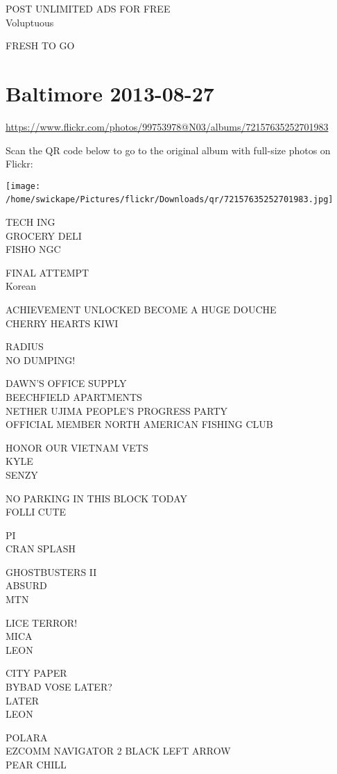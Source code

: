 \documentclass[10pt,letterpaper]{article}
\begin{document}
POST UNLIMITED ADS FOR FREE\\
Voluptuous

FRESH TO GO
\

\section*{Baltimore 2013-08-27}

\url{https://www.flickr.com/photos/99753978@N03/albums/72157635252701983}

Scan the QR code below to go to the original album with full-size photos on Flickr:

\texttt{[image: /home/swickape/Pictures/flickr/Downloads/qr/72157635252701983.jpg]}
\

TECH ING\\
GROCERY DELI\\
FISHO NGC

FINAL ATTEMPT\\
Korean

ACHIEVEMENT UNLOCKED BECOME A HUGE DOUCHE\\
CHERRY HEARTS KIWI

RADIUS\\
NO DUMPING!

DAWN'S OFFICE SUPPLY\\
BEECHFIELD APARTMENTS\\
NETHER UJIMA PEOPLE'S PROGRESS PARTY\\
OFFICIAL MEMBER NORTH AMERICAN FISHING CLUB

HONOR OUR VIETNAM VETS\\
KYLE\\
SENZY

NO PARKING IN THIS BLOCK TODAY\\
FOLLI CUTE

PI\\
CRAN SPLASH

GHOSTBUSTERS II\\
ABSURD\\
MTN

LICE TERROR!\\
MICA\\
LEON

CITY PAPER\\
BYBAD VOSE LATER?\\
LATER\\
LEON

POLARA\\
EZCOMM NAVIGATOR 2 BLACK LEFT ARROW\\
PEAR CHILL
\end{document}
